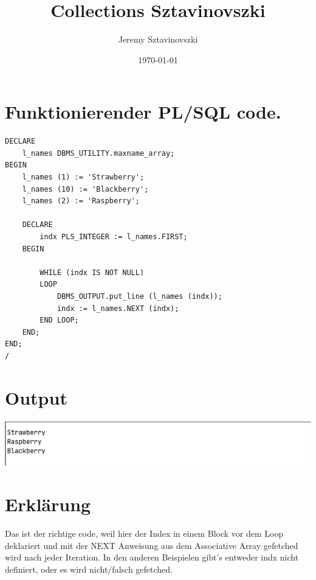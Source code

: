 \documentclass[11pt]{article}
\author{Jeremy Sztavinovszki}
\date{\today}
\title{Collections Sztavinovszki}
\begin{document}
\maketitle
\tableofcontents

\section{Funktionierender PL/SQL code.}
\label{sec:org5a9356d}
\begin{verbatim}
DECLARE
    l_names DBMS_UTILITY.maxname_array;
BEGIN
    l_names (1) := 'Strawberry';
    l_names (10) := 'Blackberry';
    l_names (2) := 'Raspberry';

    DECLARE
        indx PLS_INTEGER := l_names.FIRST;
    BEGIN

        WHILE (indx IS NOT NULL)
        LOOP
            DBMS_OUTPUT.put_line (l_names (indx));
            indx := l_names.NEXT (indx);
        END LOOP;
    END;
END;
/
\end{verbatim}
\section{Output}
\label{sec:org5fa0934}
\begin{center}
\includegraphics[width=.9\linewidth]{./output_pic.png}
\end{center}
\section{Erklärung}
\label{sec:org719fc05}
Das ist der richtige code, weil hier der Index in einem Block vor dem Loop deklariert und mit der   NEXT Anweisung aus dem Associative Array gefetched wird nach jeder Iteration.
In den anderen Beispielen gibt's entweder indx nicht definiert, oder es wird nicht/falsch gefetched.
\end{document}
